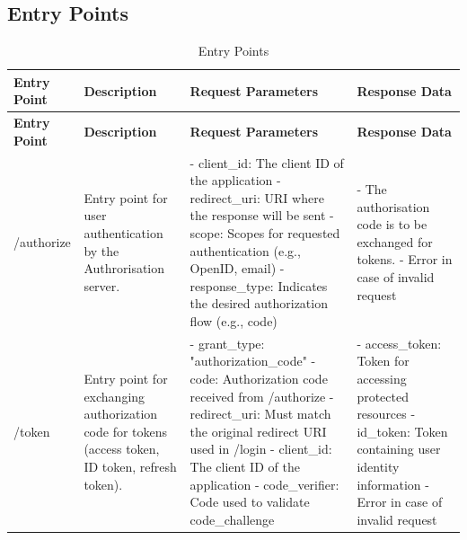 \subsection{Entry Points}
\begin{longtable}{|p{3cm}|p{4cm}|p{4cm}|p{4cm}|}
\caption{Entry Points}
\label{table:threat_model_entry_points}
\hline
\rowcolor{grey!15}
\textbf{Entry Point} & \textbf{Description} & \textbf{Request Parameters} & \textbf{Response Data} \\
\hline
\endfirsthead
\hline
\rowcolor{grey!15}
\textbf{Entry Point} & \textbf{Description} & \textbf{Request Parameters} & \textbf{Response Data} \\
\hline
\endhead
\endfoot
\hline
\endlastfoot

/authorize & Entry point for user authentication by the Authrorisation server.  & 
- client\_id: The client ID of the application \newline 
- redirect\_uri: URI where the response will be sent \newline
- scope: Scopes for requested authentication (e.g., OpenID, email) \newline 
- response\_type: Indicates the desired authorization flow (e.g., code) \citep{openid_docs} & 
- The authorisation code is to be exchanged for tokens. \newline 
- Error in case of invalid request \\
\hline

/token & Entry point for exchanging authorization code for tokens (access token, ID token, refresh token). & 
- grant\_type: "authorization\_code" \newline 
- code: Authorization code received from /authorize \newline
- redirect\_uri: Must match the original redirect URI used in /login \newline 
- client\_id: The client ID of the application
- code\_verifier: Code used to validate code\_challenge \citep{openid_docs}& 
- access\_token: Token for accessing protected resources \newline 
- id\_token: Token containing user identity information \newline 
- Error in case of invalid request \\
\hline

\end{longtable}

